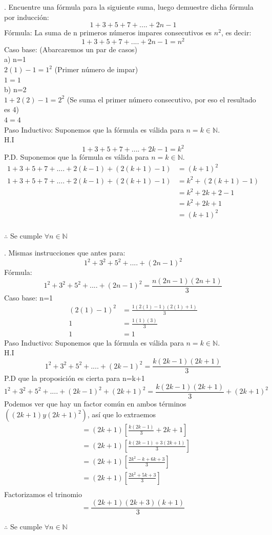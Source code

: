 \documentclass[letterpaper]{article}
\renewcommand{\*}{\cdot}
\theoremstyle{definition}
\begin{document}
. Encuentre una fórmula para la siguiente suma, luego 
demuestre dicha fórmula por inducción:
$$1+3+5+7+....+2n-1$$
Fórmula: La suma de n primeros números impares consecutivos es $n^2$, es decir:\\
$$1+3+5+7+....+2n-1=n^2$$
Caso base: (Abarcaremos un par de casos)\\
a) n=1\\
$2(1)-1=1^2$ (Primer número de impar)\\
$1=1$\\
b) n=2\\
$1+2(2)-1=2^2$ (Se suma el primer número consecutivo, por eso el resultado es 4)\\
$4=4$\\
Paso Inductivo: Suponemos que la fórmula es válida para $n=k \in \mathbb{N}.$\\
H.I 
$$1+3+5+7+....+2k-1=k^2$$
P.D. Suponemos que la fórmula es válida para $n=k \in \mathbb{N}.$\\
\begin{align*}
	1+3+5+7+....+2(k-1)+(2(k+1)-1)&=(k+1)^2\\
	1+3+5+7+....+2(k-1)+(2(k+1)-1)&=k^2+(2(k+1)-1)\\
	&=k^2+2k+2-1\\
	&=k^2+2k+1\\
	&=(k+1)^2\\
\end{align*}
\begin{center}
	$\therefore$ Se cumple $\forall{n} \in \mathbb{N}$\\
\end{center}

.	Mismas instrucciones que antes para:
$$1^2+3^2+5^2+....+(2n-1)^2$$
Fórmula:
$$1^2+3^2+5^2+....+(2n-1)^2 = \frac{n(2n-1)(2n+1)}{3}$$
Caso base: n=1
\begin{align*}
	(2(1)-1)^2&=\frac{1(2(1)-1)(2(1)+1)}{3}\\
	1&=\frac{1(1)(3)}{3}\\
	1&=1
\end{align*}
Paso Inductivo: Suponemos que la fórmula es válida para $n=k \in \mathbb{N}.$\\
H.I
$$1^2+3^2+5^2+....+(2k-1)^2 = \frac{k(2k-1)(2k+1)}{3}$$
P.D que la proposición es cierta para n=k+1
$$1^2+3^2+5^2+....+(2k-1)^2+(2k+1)^2= \frac{k(2k-1)(2k+1)}{3}+(2k+1)^2$$
Podemos ver que hay un factor común en ambos términos $((2k+1) y (2k+1)^2)$, así que lo extraemos
\begin{align*}
	&=(2k+1)[\frac{k(2k-1)}{3}+2k+1]\\
	&=(2k+1)[\frac{k(2k-1)+3(2k+1)}{3}]\\
	&=(2k+1)[\frac{2k^2-k+6k+3}{3}]\\
	&=(2k+1)[\frac{2k^2+5k+3}{3}]\\
\end{align*}
Factorizamos el trinomio
$$=\frac{(2k+1)(2k+3)(k+1)}{3}$$
\begin{center}
	$\therefore$ Se cumple $\forall{n} \in \mathbb{N}$\\
\end{center}
\end{document}
